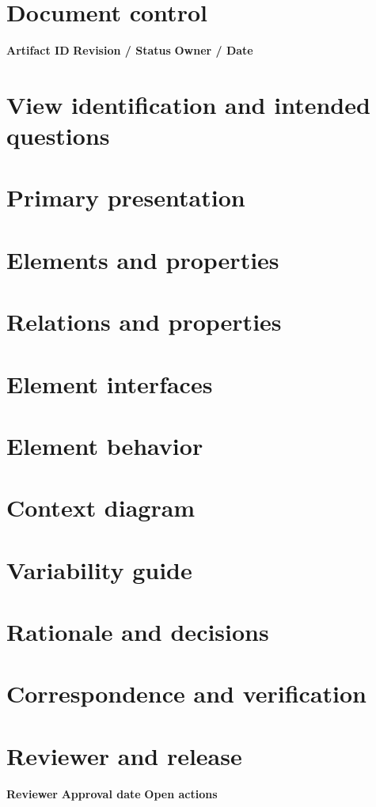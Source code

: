 \documentclass[10pt,letterpaper]{article}
\begin{document}
\DocProvenance
\section{Document control}
\textbf{Artifact ID}
\textbf{Revision / Status}
\textbf{Owner / Date}
\section{View identification and intended questions}
\section{Primary presentation}
\section{Elements and properties}
\section{Relations and properties}
\section{Element interfaces}
\section{Element behavior}
\section{Context diagram}
\section{Variability guide}
\section{Rationale and decisions}
\section{Correspondence and verification}
\section{Reviewer and release}
\textbf{Reviewer}
\textbf{Approval date}
\textbf{Open actions}
\end{document}
